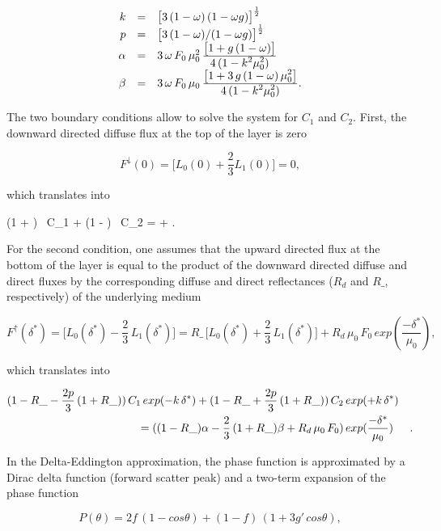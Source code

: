 \medskip
$$
\begin{array}{rcl}
k      &=& {\bigl[ 3 \, (1 - \omega) \,  (1 - \omega g)\bigr]}^{\frac{1}{2}}\cr
p      &=& {\bigl[ 3 \, (1 - \omega) / (1 - \omega g)\bigr]}^{\frac{1}{2}}\cr
\alpha &=& 3 \, \omega \, F_0 \, \mu_0^2 \, \frac{\displaystyle{\bigl[ 1 + g \, (1 - \omega) \bigr]}}{\displaystyle{4 \, (1 - k^2 \mu_0^2)}} \cr
\beta  &=& 3 \, \omega \, F_0 \, \mu_0 \, \frac{\displaystyle{\bigl[ 1 + 3 \, g \, (1 - \omega) \, \mu_0^2 \bigr]}}{\displaystyle{4 \, (1 - k^2 \mu_0^2)}}.
\end{array}
$$
\medskip

The two boundary conditions allow to solve the system for $C_1$ and $C_2$.
First, the downward directed diffuse flux at the top of the layer is zero

\medskip
\[
F^{\!\downarrow}(0) = \bigl[ L_0(0) + \frac{2}{3} L_1(0) \bigr] = 0,
\]

\noindent which translates into

\be
(1 + ) \, C_1 + (1 - ) \, C_2 = \alpha + .
\label{ecmwf323}
\ee
\medskip

\noindent For the second condition, one assumes that the upward directed flux
at the bottom of the layer is equal to the product of the downward directed
diffuse and direct fluxes by the corresponding diffuse and direct reflectances
($R_d$ and $R\_$, respectively) of the underlying medium

\medskip
\[
F^{\!\uparrow}(\delta^{*}) = \bigl[ L_0(\delta^{*}) - \frac{2}{3} \, L_1(\delta^{*}) \bigr] = R\_ \, \bigl[ L_0(\delta^{*}) + \frac{2}{3} \, L_1(\delta^{*}) \bigr] + R_d \, \mu_0 \, F_0 \, exp(\frac{-\delta^{*}}{\mu_0}),
\]
\medskip

\noindent which translates into

\medskip
\begin{eqnarray}\label{ecmwf324}
(1 - R\_ - \frac{2p}{3} \, (1 + R\_) ) \, C_1 \, exp(-k \, \delta^{*}) +
(1 - R\_ + \frac{2p}{3} \, (1 + R\_) ) \, C_2 \, &exp(+k \, \delta^{*})& \cr
\mbox{} = ( (1 - R\_)\alpha - \frac{2}{3} \, (1 + R\_)\beta +
R_d \, \mu_0 \, F_0 ) \, &exp(\frac{-\delta^{*}}{\mu_0})&.
\end{eqnarray}
\medskip

In the Delta-Eddington approximation, the phase function is approximated by a
Dirac delta function (forward scatter peak) and a two-term expansion of the
phase function

\medskip
\[
P(\theta) = 2 f \, (1 - cos\theta) + (1 - f) \, (1 + 3g' \, cos\theta),
\]

